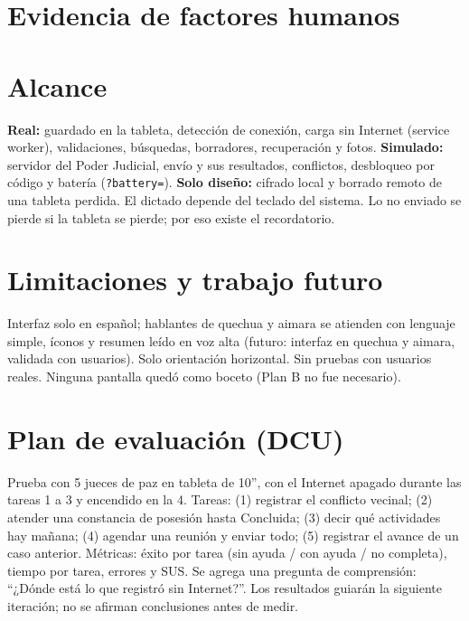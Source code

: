 \documentclass[11pt,a4paper]{article}
\begin{document}
\section{Evidencia de factores humanos}


\section{Alcance}
\textbf{Real:} guardado en la tableta, detección de conexión, carga sin Internet (service worker), validaciones, búsquedas, borradores, recuperación y fotos. \textbf{Simulado:} servidor del Poder Judicial, envío y sus resultados, conflictos, desbloqueo por código y batería (\texttt{?battery=}). \textbf{Solo diseño:} cifrado local y borrado remoto de una tableta perdida. El dictado depende del teclado del sistema. Lo no enviado se pierde si la tableta se pierde; por eso existe el recordatorio.

\section{Limitaciones y trabajo futuro}
Interfaz solo en español; hablantes de quechua y aimara se atienden con lenguaje simple, íconos y resumen leído en voz alta (futuro: interfaz en quechua y aimara, validada con usuarios). Solo orientación horizontal. Sin pruebas con usuarios reales. Ninguna pantalla quedó como boceto (Plan B no fue necesario).

\section{Plan de evaluación (DCU)}
Prueba con 5 jueces de paz en tableta de 10'', con el Internet apagado durante las tareas 1 a 3 y encendido en la 4. Tareas: (1) registrar el conflicto vecinal; (2) atender una constancia de posesión hasta Concluida; (3) decir qué actividades hay mañana; (4) agendar una reunión y enviar todo; (5) registrar el avance de un caso anterior. Métricas: éxito por tarea (sin ayuda / con ayuda / no completa), tiempo por tarea, errores y SUS. Se agrega una pregunta de comprensión: ``¿Dónde está lo que registró sin Internet?''. Los resultados guiarán la siguiente iteración; no se afirman conclusiones antes de medir.
\end{document}
